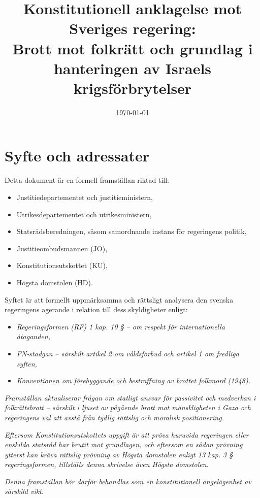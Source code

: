 \documentclass[12pt]{article}
\title{\textbf{Konstitutionell anklagelse mot Sveriges regering:\\
Brott mot folkrätt och grundlag i hanteringen av Israels krigsförbrytelser}}
\date{\today}
\begin{document}
\maketitle
\thispagestyle{empty}
\vspace{1cm}

\section{Syfte och adressater}
\label{sec:syfte}


Detta dokument är en formell framställan riktad till:

\begin{itemize}
  \item Justitiedepartementet och justitieministern,
  \item Utrikesdepartementet och utrikesministern,
  \item Statsrådsberedningen, såsom samordnande instans för regeringens politik,
  \item Justitieombudsmannen (JO),
  \item Konstitutionsutskottet (KU),
  \item Högsta domstolen (HD).
\end{itemize}

\begin{spacing}{1.2}
Syftet är att formellt uppmärksamma och rättsligt analysera den svenska regeringens agerande i relation till dess skyldigheter enligt:

\begin{itemize}
  \item \textit{Regeringsformen (RF) 1 kap. 10 § – om respekt för internationella åtaganden,}
  \item \textit{FN-stadgan – särskilt artikel 2 om våldsförbud och artikel 1 om fredliga syften,}
  \item \textit{Konventionen om förebyggande och bestraffning av brottet folkmord (1948).}
\end{itemize}

\vspace{0.5cm}
\textit{
Framställan aktualiserar frågan om statligt ansvar för passivitet och medverkan i folkrättsbrott – särskilt i ljuset av pågående brott mot mänskligheten i Gaza och regeringens val att avstå från tydlig rättslig och moralisk positionering.
}

\vspace{0.5cm}
\textit{
Eftersom Konstitutionsutskottets uppgift är att pröva huruvida regeringen eller enskilda statsråd har brutit mot grundlagen, och eftersom en sådan prövning ytterst kan kräva rättslig prövning av Högsta domstolen enligt 13 kap. 3 § regeringsformen, tillställs denna skrivelse även Högsta domstolen.
}

\vspace{0.5cm}
\textit{
Denna framställan bör därför behandlas som en konstitutionell angelägenhet av särskild vikt.
}
\end{spacing}
\end{document}
